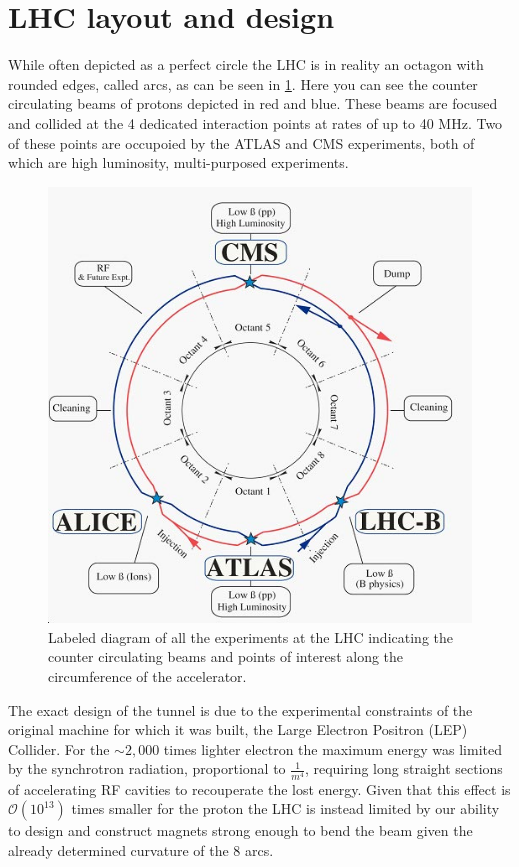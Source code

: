 \section{LHC layout and design} \label{sec:lhc:layout}

While often depicted as a perfect circle the LHC is in reality an octagon with
rounded edges, called arcs, as can be seen in \cref{fig:lhc_schematic}.
Here you can see the counter circulating beams of protons depicted in red and
blue.  These beams are focused and collided at the 4 dedicated interaction
points at rates of up to 40 MHz.  Two of these points are occupoied by the
ATLAS and CMS experiments, both of which are high luminosity, multi-purposed
experiments.

\begin{figure}[!htbp] 
  \begin{center}
    \includegraphics[width=0.9\linewidth]{figures/lhc/lhc_schematic.jpg}
    \caption{Labeled diagram of all the experiments at the LHC indicating the
counter circulating beams and points of interest along the circumference of the
accelerator.} 
    \label{fig:lhc_schematic} 
  \end{center} 
\end{figure}

The exact design of the tunnel is due to the experimental constraints of the
original machine for which it was built, the Large Electron Positron (LEP)
Collider.  For the $\sim 2,000$ times lighter electron the maximum energy was
limited by the synchrotron radiation, proportional to $\frac{1}{m^4}$, requiring
long straight sections of accelerating RF cavities to recouperate the lost
energy.  Given that this effect is $\mathcal{O}(10^{13})$ times smaller for the
proton the LHC is instead limited by our ability to design and construct magnets
strong enough to bend the beam given the already determined curvature of the 8
arcs.

